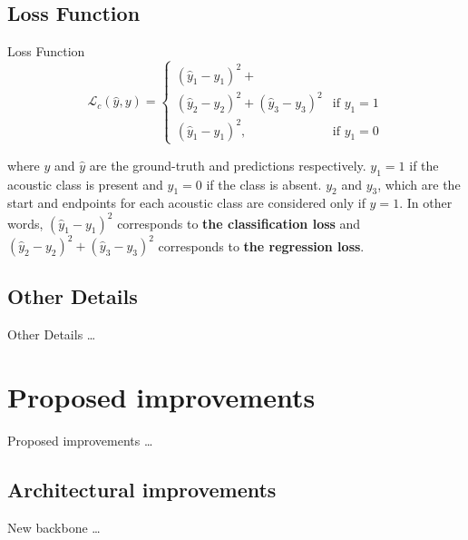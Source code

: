 	\subsection[Loss Function]{Loss Function}
	\begin{frame}{Loss Function}
		\begin{equation*}
			\mathcal{L}_{c}(\hat{y},y) = \begin{cases}
			(\hat{y}_1-y_1)^2+\\(\hat{y}_2-y_2)^2+(\hat{y}_3-y_3)^2 &\text{if $y_{1} = 1$}\\
			(\hat{y}_1-y_1)^2, &\text{if $y_1 = 0$}
			\end{cases}
		\end{equation*}
		
		where $y$ and $\hat{y}$ are the ground-truth and predictions respectively. $y_1 = 1$ if the acoustic class is present and $y_1 = 0$ if the class is absent. $y_2$ and $y_3$, which are the start and endpoints for each acoustic class are considered only if $y = 1$.
		In other words, $(\hat{y}_1-y_1)^2$ corresponds to \textbf{the classification loss} and $(\hat{y}_2-y_2)^2+(\hat{y}_3-y_3)^2$ corresponds to \textbf{the regression loss}.
		\note{
			\dots
		}
	\end{frame}
	
	\subsection[Other Details]{Other Details}
	\begin{frame}{Other Details}
		\dots
		
		\note{
			\dots
		}
	\end{frame}


\section[Proposed improvements]{Proposed improvements}

	\begin{frame}{Proposed improvements}
		\dots
		
		\note{
			\dots			
		}		
		
	\end{frame}
	

	\subsection[Architectural improvements]{Architectural improvements}
	\begin{frame}{New backbone}
		\dots
		
		\note{
			\dots			
		}		
		
	\end{frame}
